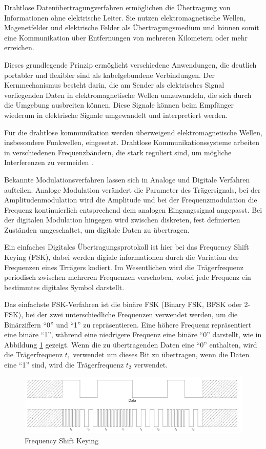 \label{sec:drahtlosedatenübertragung}
Drahtlose Datenübertragungverfahren ermöglichen die Übertragung von Informationen ohne elektrische Leiter. Sie nutzen elektromagnetische Wellen, Magenetfelder und elektrische Felder als Übertragungsmedium und können somit eine Kommunikation über Entfernungen von mehreren Kilometern oder mehr erreichen. 

Dieses grundlegende Prinzip ermöglicht verschiedene Anwendungen, die deutlich portabler und flexibler sind als kabelgebundene Verbindungen. Der Kernmechanismus besteht darin, die am Sender als elektrisches Signal vorliegenden Daten in elektromagnetische Wellen umzuwandeln, die sich durch die Umgebung ausbreiten können. Diese Signale können beim Empfänger wiederum in elektrische Signale umgewandelt und interpretiert werden. 

Für die drahtlose kommunikation werden überweigend elektromagnetische Wellen, insbesondere Funkwellen, eingesetzt. Drahtlose Kommunikationssysteme arbeiten in verschiedenen Frequenzbändern, die stark reguliert sind, um mögliche Interferenzen zu vermeiden \autocite{GrundkenntnisseDrahtlosenKommunikation2023}.

Bekannte Modulationsverfahren lassen sich in Analoge und Digitale Verfahren aufteilen. Analoge Modulation verändert die Parameter des Trägersignals, bei der Amplitudenmodulation wird die Amplitude und bei der Frequenzmodulation die Frequenz kontinuierlich entsprechend dem analogen Eingangssignal angepasst. Bei der digitalen Modulation hingegen wird zwischen diskreten, fest definierten Zuständen umgeschaltet, um digitale Daten zu übertragen. \autocite[S. 112 ff.]{ziemerPrinciplesCommunicationsSystems2015} \autocite[S. 156 ff.]{ziemerPrinciplesCommunicationsSystems2015}

Ein einfaches Digitales Übertragungsprotokoll ist hier bei das Frequency Shift Keying (FSK), dabei werden digiale informationen durch die Variation der Frequenzen eines Trrägers kodiert. Im Wesentlichen wird die Trägerfrequenz periodisch zwischen mehreren Frequenzen verschoben, wobei jede Frequenz ein bestimmtes digitales Symbol darstellt.

Das einfachste FSK-Verfahren ist die binäre FSK (Binary FSK, BFSK oder 2-FSK), bei der zwei unterschiedliche Frequenzen verwendet werden, um die Binärziffern "`0"' und "`1"' zu repräsentieren. Eine höhere Frequenz repräsentiert eine binäre "`1"', während eine niedrigere Frequenz eine binäre "`0"' darstellt, wie in Abbildung \ref{fig:frequency-shift-keying} gezeigt. Wenn die zu übertragenden Daten eine "`0"' enthalten, wird die Trägerfrequenz $t_1$ verwendet um dieses Bit zu übertragen, wenn die Daten eine "`1"' sind, wird die Trägerfrequenz $t_2$ verwendet.\autocite{FrequencyShiftKeyingModulation2024}

\begin{figure}[H]
\centering
\includegraphics[scale=.5]{figures/asstes/frequency-shift-keying.png}
\caption{Frequency Shift Keying \autocite {FrequencyShiftKeyingModulation2024}}
\label{fig:frequency-shift-keying}
\end{figure}